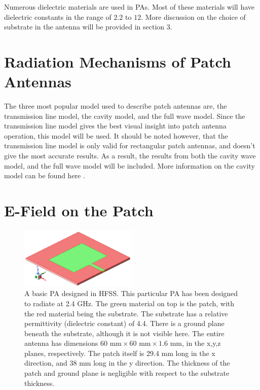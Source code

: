 \documentclass[12pt]{article}
\begin{document}
Numerous dielectric materials are used in PAs. Most of these materials will have dielectric constants in the range of $2.2$ to $12$\cite{balanis2016antenna}. More discussion on the choice of substrate in the antenna will be provided in section 3. 
\section{Radiation Mechanisms of Patch Antennas}

The three most popular model used to describe patch antennas are, the transmission line model, the cavity model, and the full wave model\cite{balanis2016antenna}. Since the transmission line model gives the best visual insight\cite{balanis2016antenna} into patch antenna operation, this model will be used. It should be noted however, that the transmission line model is only valid for rectangular patch antennas, and doesn't give the most accurate results\cite{balanis2016antenna}. As a result, the results from both the cavity wave model, and the full wave model will be included. More information on the cavity model can be found here \cite{balanis2016antenna}. 


\section{E-Field on the Patch}
 

\begin{figure}[h]
    \centering
    \includegraphics[width=0.5\textwidth]{2.4GHz-basic-pa.png}
    \caption{A basic PA designed in HFSS. This particular PA has been designed to radiate at 2.4 GHz. The green material on top is the patch, with the red material being the substrate. The substrate has a relative permittivity (dielectric constant) of 4.4. There is a ground plane beneath the substrate, although it is not visible here. The entire antenna has dimensions $60 \text{ mm} \times 60 \text{ mm} \times 1.6 \text{ mm}$, in the x,y,z planes, respectively. The patch itself is 29.4 mm long in the x direction, and 38 mm long in the y direction. The thickness of the patch and ground plane is negligible with respect to the substrate thickness. }
\end{figure}
\end{document}
